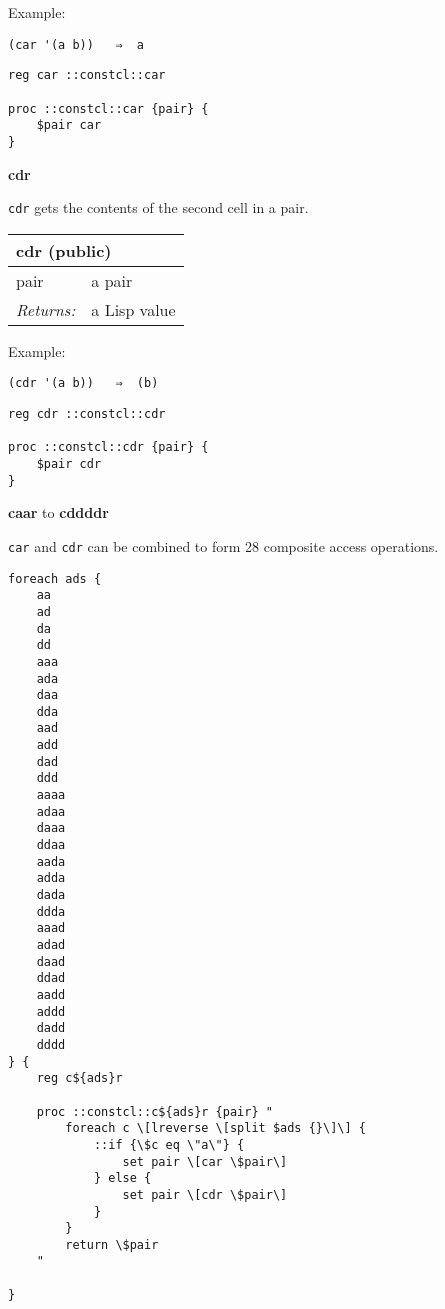 \documentclass{report}
\begin{document}
Example:

\noindent\makebox[\linewidth]{\rule{\linewidth}{0.4pt}}
\begin{lstlisting}
(car '(a b))   ⇒  a
\end{lstlisting}
\noindent\makebox[\linewidth]{\rule{\linewidth}{0.4pt}}
\noindent\makebox[\linewidth]{\rule{\linewidth}{0.4pt}}
\begin{lstlisting}
reg car ::constcl::car
 
proc ::constcl::car {pair} {
    $pair car
}
\end{lstlisting}
\noindent\makebox[\linewidth]{\rule{\linewidth}{0.4pt}}

\textbf{cdr}


\texttt{cdr} gets the contents of the second cell in a pair.

\begin{tabular}{ |l l| }
\hline
\multicolumn{2}{|l|}{cdr (public)} \\
\hline
pair & a pair \\
\textit{Returns:} & a Lisp value \\
\hline
\end{tabular}


Example:

\noindent\makebox[\linewidth]{\rule{\linewidth}{0.4pt}}
\begin{lstlisting}
(cdr '(a b))   ⇒  (b)
\end{lstlisting}
\noindent\makebox[\linewidth]{\rule{\linewidth}{0.4pt}}
\noindent\makebox[\linewidth]{\rule{\linewidth}{0.4pt}}
\begin{lstlisting}
reg cdr ::constcl::cdr
 
proc ::constcl::cdr {pair} {
    $pair cdr
}
\end{lstlisting}
\noindent\makebox[\linewidth]{\rule{\linewidth}{0.4pt}}

\textbf{caar} to \textbf{cddddr}


\texttt{car} and \texttt{cdr} can be combined to form 28 composite access operations.

\noindent\makebox[\linewidth]{\rule{\linewidth}{0.4pt}}
\begin{lstlisting}
foreach ads {
    aa
    ad
    da
    dd
    aaa
    ada
    daa
    dda
    aad
    add
    dad
    ddd
    aaaa
    adaa
    daaa
    ddaa
    aada
    adda
    dada
    ddda
    aaad
    adad
    daad
    ddad
    aadd
    addd
    dadd
    dddd
} {
    reg c${ads}r
 
    proc ::constcl::c${ads}r {pair} "
        foreach c \[lreverse \[split $ads {}\]\] {
            ::if {\$c eq \"a\"} {
                set pair \[car \$pair\]
            } else {
                set pair \[cdr \$pair\]
            }
        }
        return \$pair
    "
 
}
\end{lstlisting}
\noindent\makebox[\linewidth]{\rule{\linewidth}{0.4pt}}
\end{document}
